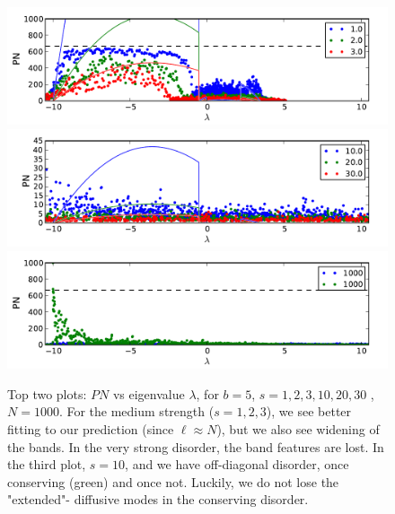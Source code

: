 \documentclass[onecolumn,fleqn,longbibliography]{revtex4}
\begin{document}
\begin{figure}[H]
    \includegraphics{pta_anderson_strong}\\
    \includegraphics{pta_anderson_very_strong}\\
    \includegraphics{pta_anderson_b5_s10_ROD_VS_SC}
    \caption{Top two plots: $PN$ vs eigenvalue $\lambda$, for $b=5$, $s={1,2,3,10,20,30}$ ,$N=1000$. 
    For the medium strength ($s={1,2,3}$), we see better fitting to our prediction (since $\ell \approx N$),
    but we also see widening of the bands. In the very strong disorder, the band features are lost.
    In the third plot, $s=10$, and we have off-diagonal disorder, once conserving (green) and once not.
    Luckily, we do not lose the "extended"- diffusive modes in the conserving disorder.}
    \label{fig:strong}
\end{figure}







\end{document}
